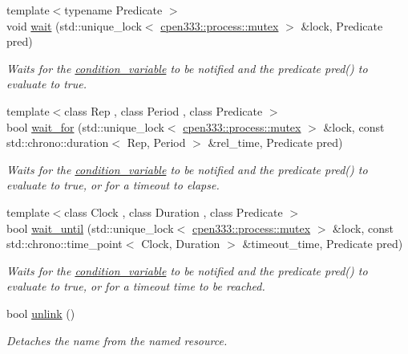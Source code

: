 \begin{DoxyCompactItemize}
{\footnotesize template$<$typename Predicate $>$ }\\void \hyperlink{classcpen333_1_1process_1_1condition__variable_a17c52558451f262f411da1944319eb46}{wait} (std\+::unique\+\_\+lock$<$ \hyperlink{classcpen333_1_1process_1_1mutex}{cpen333\+::process\+::mutex} $>$ \&lock, Predicate pred)
\begin{DoxyCompactList}\small\item\em Waits for the \hyperlink{classcpen333_1_1process_1_1condition__variable}{condition\+\_\+variable} to be notified and the predicate {\ttfamily pred()} to evaluate to {\ttfamily true}. \end{DoxyCompactList}\item 
{\footnotesize template$<$class Rep , class Period , class Predicate $>$ }\\bool \hyperlink{classcpen333_1_1process_1_1condition__variable_af610e3f28f9c5ea4c24b35cca125ff45}{wait\+\_\+for} (std\+::unique\+\_\+lock$<$ \hyperlink{classcpen333_1_1process_1_1mutex}{cpen333\+::process\+::mutex} $>$ \&lock, const std\+::chrono\+::duration$<$ Rep, Period $>$ \&rel\+\_\+time, Predicate pred)
\begin{DoxyCompactList}\small\item\em Waits for the \hyperlink{classcpen333_1_1process_1_1condition__variable}{condition\+\_\+variable} to be notified and the predicate {\ttfamily pred()} to evaluate to {\ttfamily true}, or for a timeout to elapse. \end{DoxyCompactList}\item 
{\footnotesize template$<$class Clock , class Duration , class Predicate $>$ }\\bool \hyperlink{classcpen333_1_1process_1_1condition__variable_adc559f5d5dd4af9505975c7e64d62d6e}{wait\+\_\+until} (std\+::unique\+\_\+lock$<$ \hyperlink{classcpen333_1_1process_1_1mutex}{cpen333\+::process\+::mutex} $>$ \&lock, const std\+::chrono\+::time\+\_\+point$<$ Clock, Duration $>$ \&timeout\+\_\+time, Predicate pred)
\begin{DoxyCompactList}\small\item\em Waits for the \hyperlink{classcpen333_1_1process_1_1condition__variable}{condition\+\_\+variable} to be notified and the predicate {\ttfamily pred()} to evaluate to {\ttfamily true}, or for a timeout time to be reached. \end{DoxyCompactList}\item 
bool \hyperlink{classcpen333_1_1process_1_1condition__variable_a2861ec071acc52be7ca5790edd062ee8}{unlink} ()
\begin{DoxyCompactList}\small\item\em Detaches the name from the named resource. \end{DoxyCompactList}\end{DoxyCompactItemize}
